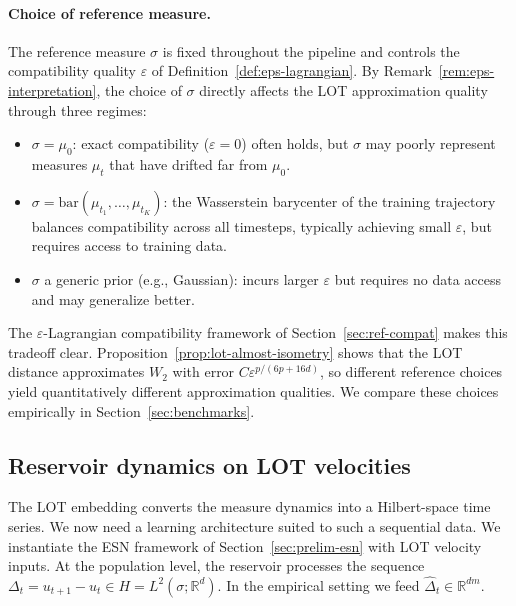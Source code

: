 \documentclass[11pt]{article}
\newcommand{\R}{\mathbb{R}}
\newcommand{\1}{\mathbf{1}}
\begin{document}
\paragraph{Choice of reference measure.}
The reference measure $\sigma$ is fixed throughout the pipeline and controls the compatibility quality $\varepsilon$ of Definition~\ref{def:eps-lagrangian}. By Remark~\ref{rem:eps-interpretation}, the choice of $\sigma$ directly affects the LOT approximation quality through three regimes:
\begin{itemize}
  \item $\sigma = \mu_0$: exact compatibility ($\varepsilon = 0$) often
        holds, but $\sigma$ may poorly represent measures $\mu_t$ that have
        drifted far from $\mu_0$.
  \item $\sigma = \mathrm{bar}(\mu_{t_1}, \ldots, \mu_{t_K})$: the
        Wasserstein barycenter of the training trajectory balances
        compatibility across all timesteps, typically achieving small
        $\varepsilon$, but requires access to training data.
  \item $\sigma$ a generic prior (e.g., Gaussian): incurs larger
        $\varepsilon$ but requires no data access and may generalize better.
\end{itemize}
The $\varepsilon$-Lagrangian compatibility framework of Section~\ref{sec:ref-compat} makes this tradeoff clear. Proposition~\ref{prop:lot-almost-isometry} shows that the LOT distance approximates $W_2$ with error $C\varepsilon^{p/(6p+16d)}$, so different
reference choices yield quantitatively different approximation qualities. We compare these choices empirically in Section~\ref{sec:benchmarks}.


\subsection{Reservoir dynamics on LOT velocities}\label{sec:rc-dynamics}

The LOT embedding converts the measure dynamics into a Hilbert-space time series. We now need a learning architecture suited to such a sequential data. We instantiate the ESN framework of Section~\ref{sec:prelim-esn} with LOT velocity inputs. At the population level, the reservoir processes the sequence $\Delta_t = u_{t+1} - u_t \in H = L^2(\sigma; \R^d)$. In the empirical setting we feed $\hat{\Delta}_t \in \R^{dm}$.
\end{document}
